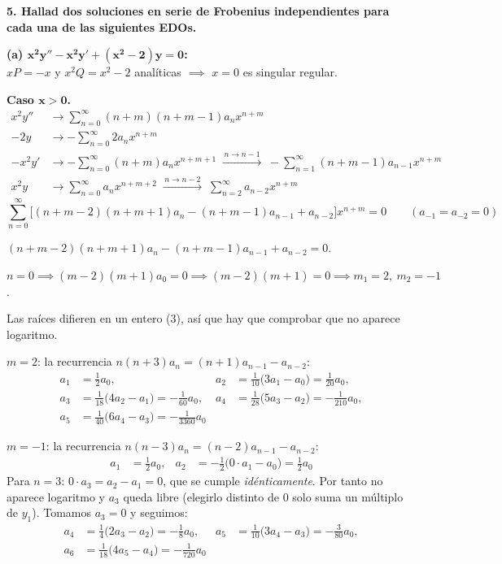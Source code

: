 \documentclass[11pt, a4paper]{article}
\begin{document}
\noindent\textbf{5. Hallad dos soluciones en serie de Frobenius independientes para cada una de las siguientes EDOs.}

\medskip
\noindent\textbf{(a) $\bm{x^2y''-x^2y'+(x^2-2)y=0}$:} \\
$xP=-x$ y $x^2Q=x^2-2$ analíticas $\implies$ $x=0$ es singular regular.

\vspace{0.2cm}\noindent\textbf{Caso $\bm{x>0}$.}
\begin{align*}
x^2y'' &\to \sum_{n=0}^\infty (n+m)(n+m-1)a_nx^{n+m} \\
-2y &\to -\sum_{n=0}^\infty 2a_nx^{n+m} \\
-x^2y' &\to -\sum_{n=0}^\infty (n+m)a_nx^{n+m+1} \;\xrightarrow{\,n\to n-1\,}\; -\sum_{n=1}^\infty (n+m-1)a_{n-1}x^{n+m} \\
x^2y &\to \sum_{n=0}^\infty a_nx^{n+m+2} \;\xrightarrow{\,n\to n-2\,}\; \sum_{n=2}^\infty a_{n-2}x^{n+m}
\end{align*}
\[
\sum_{n=0}^\infty\Big[(n+m-2)(n+m+1)a_n-(n+m-1)a_{n-1}+a_{n-2}\Big]x^{n+m}=0 \qquad (a_{-1}=a_{-2}=0)
\]

\smallskip\noindent $(n+m-2)(n+m+1)a_n-(n+m-1)a_{n-1}+a_{n-2}=0$.

\smallskip\noindent $n=0 \implies (m-2)(m+1)a_0=0 \implies (m-2)(m+1)=0 \implies m_1=2,\ m_2=-1$.

\smallskip\noindent Las raíces difieren en un entero ($3$), así que hay que comprobar que no aparece logaritmo.

\smallskip\noindent $m=2$: la recurrencia $n(n+3)a_n=(n+1)a_{n-1}-a_{n-2}$:
\begin{align*}
a_1&=\tfrac12a_0, & a_2&=\tfrac1{10}\Big(3a_1-a_0\Big)=\tfrac1{20}a_0, \\
a_3&=\tfrac1{18}\Big(4a_2-a_1\Big)=-\tfrac1{60}a_0, & a_4&=\tfrac1{28}\Big(5a_3-a_2\Big)=-\tfrac1{210}a_0, \\
a_5&=\tfrac1{40}\Big(6a_4-a_3\Big)=-\tfrac1{3360}a_0
\end{align*}

\smallskip\noindent $m=-1$: la recurrencia $n(n-3)a_n=(n-2)a_{n-1}-a_{n-2}$:
\begin{align*}
a_1&=\tfrac12a_0, & a_2&=-\tfrac12\Big(0\cdot a_1-a_0\Big)=\tfrac12a_0
\end{align*}
Para $n=3$: $0\cdot a_3=a_2-a_1=0$, que se cumple \emph{idénticamente}. Por tanto no aparece logaritmo y $a_3$ queda libre (elegirlo distinto de $0$ solo suma un múltiplo de $y_1$). Tomamos $a_3=0$ y seguimos:
\begin{align*}
a_4&=\tfrac14\Big(2a_3-a_2\Big)=-\tfrac18a_0, & a_5&=\tfrac1{10}\Big(3a_4-a_3\Big)=-\tfrac3{80}a_0, \\ a_6&=\tfrac1{18}\Big(4a_5-a_4\Big)=-\tfrac1{720}a_0
\end{align*}
\end{document}

